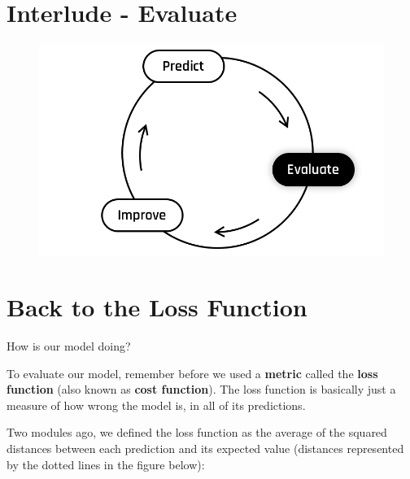 
\section*{Interlude - Evaluate}

\begin{figure}[!h]
    \centering
    \includegraphics[scale=0.25]{assets/Evaluate.png}
\end{figure}


\section*{Back to the Loss Function}
How is our model doing?  

To evaluate our model, remember before we used a \textbf{metric} called the \textbf{loss function} (also known as \textbf{cost function}).
The loss function is basically just a measure of how wrong the model is, in all of its predictions.

Two modules ago, we defined the loss function as the average of the squared distances between each prediction and its expected value (distances represented by the dotted lines in the figure below):

